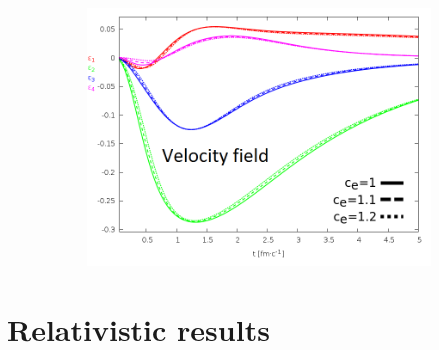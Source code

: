 \documentclass{beamer}
\begin{document}
\begin{frame}
\begin{center}
\begin{figure}[H]
\begin{subfigure}[b]{0.49\textwidth}
        	\includegraphics[width=\textwidth]{pic/res/nonrel/eps_ec_v}
	\end{subfigure}
\end{figure}
\end{center}
\end{frame}

\section{Relativistic results}
\end{document}
